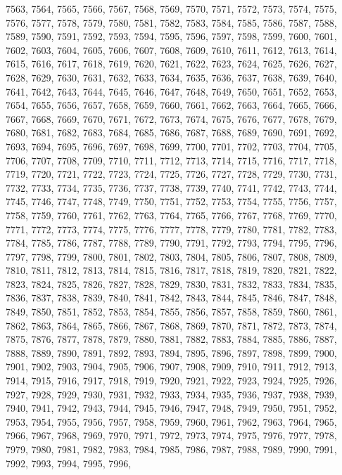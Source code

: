 7563,
7564,
7565,
7566,
7567,
7568,
7569,
7570,
7571,
7572,
7573,
7574,
7575,
7576,
7577,
7578,
7579,
7580,
7581,
7582,
7583,
7584,
7585,
7586,
7587,
7588,
7589,
7590,
7591,
7592,
7593,
7594,
7595,
7596,
7597,
7598,
7599,
7600,
7601,
7602,
7603,
7604,
7605,
7606,
7607,
7608,
7609,
7610,
7611,
7612,
7613,
7614,
7615,
7616,
7617,
7618,
7619,
7620,
7621,
7622,
7623,
7624,
7625,
7626,
7627,
7628,
7629,
7630,
7631,
7632,
7633,
7634,
7635,
7636,
7637,
7638,
7639,
7640,
7641,
7642,
7643,
7644,
7645,
7646,
7647,
7648,
7649,
7650,
7651,
7652,
7653,
7654,
7655,
7656,
7657,
7658,
7659,
7660,
7661,
7662,
7663,
7664,
7665,
7666,
7667,
7668,
7669,
7670,
7671,
7672,
7673,
7674,
7675,
7676,
7677,
7678,
7679,
7680,
7681,
7682,
7683,
7684,
7685,
7686,
7687,
7688,
7689,
7690,
7691,
7692,
7693,
7694,
7695,
7696,
7697,
7698,
7699,
7700,
7701,
7702,
7703,
7704,
7705,
7706,
7707,
7708,
7709,
7710,
7711,
7712,
7713,
7714,
7715,
7716,
7717,
7718,
7719,
7720,
7721,
7722,
7723,
7724,
7725,
7726,
7727,
7728,
7729,
7730,
7731,
7732,
7733,
7734,
7735,
7736,
7737,
7738,
7739,
7740,
7741,
7742,
7743,
7744,
7745,
7746,
7747,
7748,
7749,
7750,
7751,
7752,
7753,
7754,
7755,
7756,
7757,
7758,
7759,
7760,
7761,
7762,
7763,
7764,
7765,
7766,
7767,
7768,
7769,
7770,
7771,
7772,
7773,
7774,
7775,
7776,
7777,
7778,
7779,
7780,
7781,
7782,
7783,
7784,
7785,
7786,
7787,
7788,
7789,
7790,
7791,
7792,
7793,
7794,
7795,
7796,
7797,
7798,
7799,
7800,
7801,
7802,
7803,
7804,
7805,
7806,
7807,
7808,
7809,
7810,
7811,
7812,
7813,
7814,
7815,
7816,
7817,
7818,
7819,
7820,
7821,
7822,
7823,
7824,
7825,
7826,
7827,
7828,
7829,
7830,
7831,
7832,
7833,
7834,
7835,
7836,
7837,
7838,
7839,
7840,
7841,
7842,
7843,
7844,
7845,
7846,
7847,
7848,
7849,
7850,
7851,
7852,
7853,
7854,
7855,
7856,
7857,
7858,
7859,
7860,
7861,
7862,
7863,
7864,
7865,
7866,
7867,
7868,
7869,
7870,
7871,
7872,
7873,
7874,
7875,
7876,
7877,
7878,
7879,
7880,
7881,
7882,
7883,
7884,
7885,
7886,
7887,
7888,
7889,
7890,
7891,
7892,
7893,
7894,
7895,
7896,
7897,
7898,
7899,
7900,
7901,
7902,
7903,
7904,
7905,
7906,
7907,
7908,
7909,
7910,
7911,
7912,
7913,
7914,
7915,
7916,
7917,
7918,
7919,
7920,
7921,
7922,
7923,
7924,
7925,
7926,
7927,
7928,
7929,
7930,
7931,
7932,
7933,
7934,
7935,
7936,
7937,
7938,
7939,
7940,
7941,
7942,
7943,
7944,
7945,
7946,
7947,
7948,
7949,
7950,
7951,
7952,
7953,
7954,
7955,
7956,
7957,
7958,
7959,
7960,
7961,
7962,
7963,
7964,
7965,
7966,
7967,
7968,
7969,
7970,
7971,
7972,
7973,
7974,
7975,
7976,
7977,
7978,
7979,
7980,
7981,
7982,
7983,
7984,
7985,
7986,
7987,
7988,
7989,
7990,
7991,
7992,
7993,
7994,
7995,
7996,
